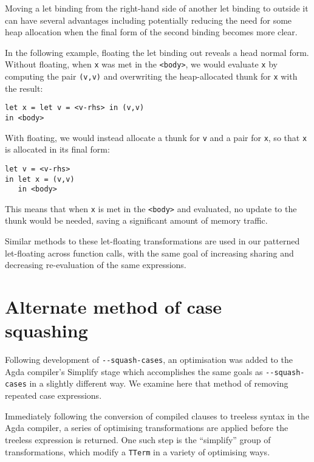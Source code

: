 \begin{enumerate}
Moving a let binding from the right-hand side of another let binding to outside it can have several advantages including potentially reducing the need for some heap allocation when the final form of the second binding becomes more clear.\citep{jones1996}

In the following example, floating the let binding out reveals a head normal form. Without floating, when \lstinline{x} was met in the \lstinline{<body>}, we would evaluate \lstinline{x} by computing the pair \lstinline{(v,v)} and overwriting the heap-allocated thunk for \lstinline{x} with the result:

\begin{lstlisting}
let x = let v = <v-rhs> in (v,v)
in <body>
\end{lstlisting}

With floating, we would instead allocate a thunk for \lstinline{v} and a pair for \lstinline{x}, so that \lstinline{x} is allocated in its final form:

\begin{lstlisting}
let v = <v-rhs>
in let x = (v,v)
   in <body>
\end{lstlisting}

This means that when \lstinline{x} is met in the \lstinline{<body>} and evaluated, no update to the thunk would be needed, saving a significant amount of memory traffic.\citep{jones1996}

\end{enumerate}

Similar methods to these let-floating transformations are used in our patterned let-floating across function calls, with the same goal of increasing sharing and decreasing re-evaluation of the same expressions.

\section{Alternate method of case squashing}
\label{sub:alternate_case_squash}

Following development of \texttt{-{}-squash-cases}, an optimisation was added to the Agda compiler's Simplify stage which accomplishes the same goals as \texttt{-{}-squash-cases} in a slightly different way. We examine here that method of removing repeated case expressions.

Immediately following the conversion of compiled clauses to treeless syntax in the Agda compiler, a series of optimising transformations are applied before the treeless expression is returned. One such step is the ``simplify'' group of transformations, which modify a \lstinline{TTerm} in a variety of optimising ways.

